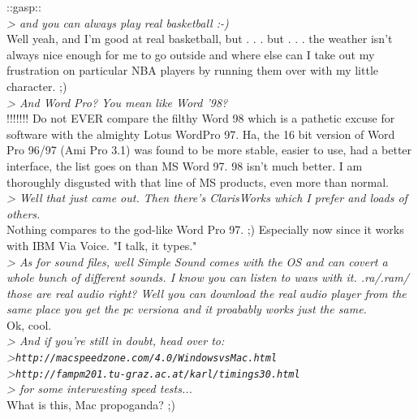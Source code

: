 \documentclass[11pt,twoside,a4paper]{article}
\begin{document}
\begin{multicols*}{2}
::gasp::~\\

\emph{> and you can always play real basketball :-)}~\\

Well yeah, and I'm good at real basketball, but . . . but . . . the weather isn't always nice enough for me to go outside and where else can I take out my frustration on particular NBA players by running them over with my little character.  ;)~\\

\emph{> And Word Pro? You mean like Word '98? }~\\

!!!!!!!  Do not EVER compare the filthy Word 98 which is a pathetic excuse for software with the almighty Lotus WordPro 97.  Ha, the 16 bit version of Word Pro 96/97 (Ami Pro 3.1) was found to be more stable, easier to use, had a better interface, the list goes on than MS Word 97.  98 isn't much better. I am thoroughly disgusted with that line of MS products, even more than normal.~\\

\emph{> Well that just came out. Then there's ClarisWorks which I prefer and loads of others. }~\\

Nothing compares to the god-like Word Pro 97.  ;)  Especially now since it works with IBM Via Voice.  "I talk, it types."~\\

\emph{> As for sound files, well Simple Sound comes with the OS and can covert a whole bunch of different sounds. I know you can listen to wavs with it. .ra/.ram/ those are real audio right? Well you can download the real audio player from the same place you get the pc versiona and it proabably works just the same. }~\\

Ok, cool.~\\

\emph{> And if you're still in doubt, head over to:}~\\

\emph{>\texttt{http://macspeedzone.com/4.0/WindowsvsMac.html}}~\\
\emph{>\texttt{http://fampm201.tu-graz.ac.at/karl/timings30.html}}~\\

\emph{> for some interwesting speed tests...}~\\

What is this, Mac propoganda?  ;)


\end{multicols*}
\end{document}
